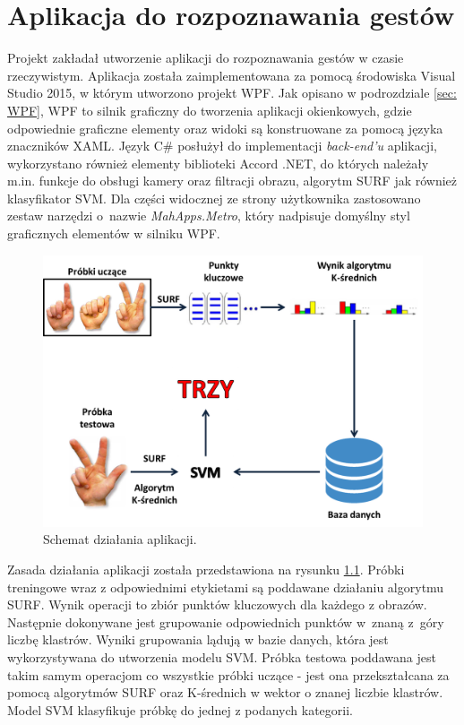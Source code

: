 \chapter{Aplikacja do rozpoznawania gestów}
Projekt zakładał utworzenie aplikacji do rozpoznawania gestów w czasie rzeczywistym. Aplikacja została zaimplementowana za pomocą środowiska Visual Studio 2015, w którym utworzono projekt WPF. Jak opisano w podrozdziale \ref{sec: WPF}, WPF to silnik graficzny do tworzenia aplikacji okienkowych, gdzie odpowiednie graficzne elementy oraz widoki są konstruowane za pomocą języka znaczników XAML. Język C\# posłużył do implementacji \textit{back-end'u} aplikacji, wykorzystano również elementy biblioteki Accord .NET, do których należały m.in. funkcje do obsługi kamery oraz filtracji obrazu, algorytm SURF jak również klasyfikator SVM. Dla części widocznej ze strony użytkownika zastosowano zestaw narzędzi o~nazwie \textit{MahApps.Metro}, który nadpisuje domyślny styl graficznych elementów w silniku WPF.

\begin{figure}[h]
	\centering
	\includegraphics[width=16cm]{ApplicationFlowChart}
	\centering
	\caption{Schemat działania aplikacji.}
	\label{im: ApplicationFlowChart}
\end{figure}

Zasada działania aplikacji została przedstawiona na rysunku \ref{im: ApplicationFlowChart}. Próbki treningowe wraz z odpowiednimi etykietami są poddawane działaniu algorytmu SURF. Wynik operacji to zbiór punktów kluczowych dla każdego z obrazów. Następnie dokonywane jest grupowanie odpowiednich punktów w~znaną z~góry liczbę klastrów. Wyniki grupowania lądują w bazie danych, która jest wykorzystywana do utworzenia modelu SVM. 
Próbka testowa poddawana jest takim samym operacjom co wszystkie próbki uczące - jest ona przekształcana za pomocą algorytmów SURF oraz K-średnich w wektor o znanej liczbie klastrów. Model SVM klasyfikuje próbkę do jednej z podanych kategorii. 


